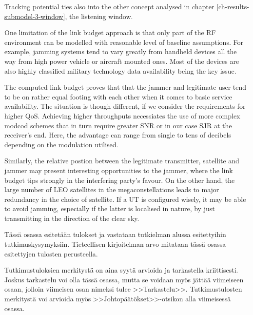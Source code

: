 \documentclass[english, 12pt, a4paper, elec, utf8, a-1b, online]{aaltothesis}
\begin{document}
Tracking potential ties also into the other concept analysed in chapter \ref{ch-results-submodel-3-window}, the listening window.


One limitation of the link budget approach is that only part of the RF environment can be modelled with reasonable level of baseline assumptions. For example, jamming systems tend to vary greatly from handheld devices all the way from high power vehicle or aircraft mounted ones. Most of the devices are also highly classified military technology data availability being the key issue.

The computed link budget proves that that the jammer and legitimate user tend to be on rather equal footing with each other when it comes to basic service availability. The situation is though different, if we consider the requirements for higher QoS. Achieving higher throughputs necessiates the use of more complex modcod schemes that in turn require greater SNR or in our case SJR at the receiver's end. Here, the advantage can range from single to tens of decibels depending on the modulation utilised.

Similarly, the relative postion between the legitimate transmitter, satellite and jammer may present interesting opportunities to the jammer, where the link budget tips strongly in the interfering party's favour. On the other hand, the large number of LEO satellites in the megaconstellations leads to major redundancy in the choice of satellite. If a UT is configured wisely, it may be able to avoid jamming, especially if the latter is localised in nature, by just transmitting in the direction of the clear sky.


T\"ass\"a osassa esitet\"a\"an tulokset ja vastataan tutkielman alussa
esitettyihin tutkimuskysymyksiin.
Tieteellisen kirjoitelman
arvo mitataan t\"ass\"a osassa esitettyjen tulosten perusteella.

Tutkimustuloksien merkityst\"a on aina syyt\"a arvioida ja tarkastella
kriittisesti.  Joskus tarkastelu voi olla t\"ass\"a osassa, mutta se
voidaan my\"os j\"att\"a\"a viimeiseen osaan, jolloin viimeisen osan nimeksi
tulee >>Tarkastelu>>. Tutkimustulosten merkityst\"a voi arvioida my\"os
>>Johtop\"a\"at\"okset>>-otsikon alla viimeisess\"a osassa.
\end{document}
